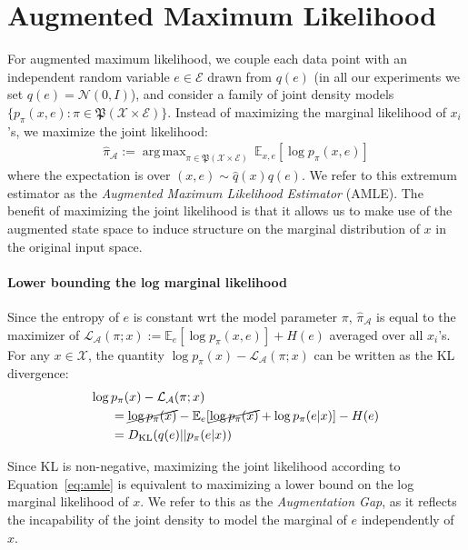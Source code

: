 \documentclass{article}
\def\gA{{\mathcal{A}}}
\def\gE{{\mathcal{E}}}
\def\gL{{\mathcal{L}}}
\def\gN{{\mathcal{N}}}
\def\gX{{\mathcal{X}}}
\newcommand{\E}{\mathbb{E}}
\newcommand{\KL}{D_{\mathrm{KL}}}
\DeclareMathOperator*{\argmax}{arg\,max}
\begin{document}
\section{Augmented Maximum Likelihood}
\label{sec:amle}
For augmented maximum likelihood, we couple each data point with an independent random variable $e\in\gE$ drawn from $q(e)$ (in all our experiments we set $q(e)=\gN(0,I)$), and consider a family of joint density models $\{p_\pi(x,e): \pi\in\mathfrak{P}(\gX\times\gE)\}$. 
Instead of maximizing the marginal likelihood of $x_i$'s, we maximize the joint likelihood:
\begin{align}
\hat{\pi}_\gA:=
\argmax_{\pi\in\mathfrak{P}(\gX\times\gE)}\, \E_{x,e}[\log p_\pi(x,e)]
\label{eq:amle}
\end{align}
where the expectation is over $(x,e)\sim \hat{q}(x)q(e)$.
We refer to this extremum estimator as the \emph{Augmented Maximum Likelihood Estimator} (AMLE).
The benefit of maximizing the joint likelihood is that it allows us to make use of the augmented state space to induce structure on the marginal distribution of $x$ in
the original input space.


\paragraph{Lower bounding the log marginal likelihood} 
Since the entropy of $e$ is constant wrt the model parameter $\pi$, $\hat{\pi}_\gA$ is equal to the maximizer of $\gL_\gA(\pi; x):=\E_{e}[\log p_\pi(x,e)] + H(e)$ averaged over all $x_i$'s.
For any $x\in\gX$, the quantity $\log p_\pi(x) - \gL_\gA(\pi; x) $ can be written as the KL divergence:
\begin{align*}
\log\,&p_\pi(x) - \gL_\gA(\pi; x) \\ 
&= \cancel{\log p_\pi(x)} - \E_{e}[\cancel{\log p_\pi(x)} + \log p_\pi(e|x)] - H(e) \\
&= \KL(q(e)||p_\pi(e|x))
\end{align*}

Since KL is non-negative, maximizing the joint likelihood according to Equation~\ref{eq:amle} is equivalent to maximizing a lower bound on the log marginal likelihood of $x$.
We refer to this as the \emph{Augmentation Gap}, as it reflects the incapability of the joint density to model the marginal of $e$ independently of $x$. 
\end{document}
